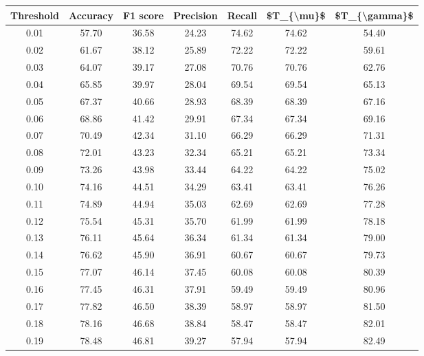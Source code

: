 \begin{tabular}{|c|c|c|c|c|c|c|}
\hline
 Threshold &  Accuracy &  F1 score &  Precision &  Recall &  \$T\_\{\textbackslash mu\}\$ &  \$T\_\{\textbackslash gamma\}\$ \\
\hline
      0.01 &     57.70 &     36.58 &      24.23 &   74.62 &      74.62 &         54.40 \\
      0.02 &     61.67 &     38.12 &      25.89 &   72.22 &      72.22 &         59.61 \\
      0.03 &     64.07 &     39.17 &      27.08 &   70.76 &      70.76 &         62.76 \\
      0.04 &     65.85 &     39.97 &      28.04 &   69.54 &      69.54 &         65.13 \\
      0.05 &     67.37 &     40.66 &      28.93 &   68.39 &      68.39 &         67.16 \\
      0.06 &     68.86 &     41.42 &      29.91 &   67.34 &      67.34 &         69.16 \\
      0.07 &     70.49 &     42.34 &      31.10 &   66.29 &      66.29 &         71.31 \\
      0.08 &     72.01 &     43.23 &      32.34 &   65.21 &      65.21 &         73.34 \\
      0.09 &     73.26 &     43.98 &      33.44 &   64.22 &      64.22 &         75.02 \\
      0.10 &     74.16 &     44.51 &      34.29 &   63.41 &      63.41 &         76.26 \\
      0.11 &     74.89 &     44.94 &      35.03 &   62.69 &      62.69 &         77.28 \\
      0.12 &     75.54 &     45.31 &      35.70 &   61.99 &      61.99 &         78.18 \\
      0.13 &     76.11 &     45.64 &      36.34 &   61.34 &      61.34 &         79.00 \\
      0.14 &     76.62 &     45.90 &      36.91 &   60.67 &      60.67 &         79.73 \\
      0.15 &     77.07 &     46.14 &      37.45 &   60.08 &      60.08 &         80.39 \\
      0.16 &     77.45 &     46.31 &      37.91 &   59.49 &      59.49 &         80.96 \\
      0.17 &     77.82 &     46.50 &      38.39 &   58.97 &      58.97 &         81.50 \\
      0.18 &     78.16 &     46.68 &      38.84 &   58.47 &      58.47 &         82.01 \\
      0.19 &     78.48 &     46.81 &      39.27 &   57.94 &      57.94 &         82.49 \\

\end{tabular}
